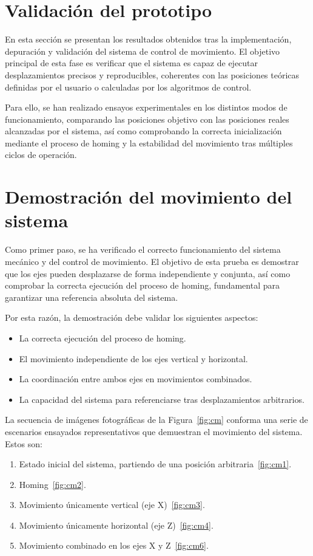 \section{Validación del prototipo}

En esta sección se presentan los resultados obtenidos tras la implementación, depuración y validación del sistema de control de movimiento. El objetivo principal de esta fase es verificar que el sistema es capaz de ejecutar desplazamientos precisos y reproducibles, coherentes con las posiciones teóricas definidas por el usuario o calculadas por los algoritmos de control.

Para ello, se han realizado ensayos experimentales en los distintos modos de funcionamiento, comparando las posiciones objetivo con las posiciones reales alcanzadas por el sistema, así como comprobando la correcta inicialización mediante el proceso de homing y la estabilidad del movimiento tras múltiples ciclos de operación.


\section{Demostración del movimiento del sistema}

Como primer paso, se ha verificado el correcto funcionamiento del sistema mecánico y del control de movimiento. El objetivo de esta prueba es demostrar que los ejes pueden desplazarse de forma independiente y conjunta, así como comprobar la correcta ejecución del proceso de homing, fundamental para garantizar una referencia absoluta del sistema. 

Por esta razón, la demostración debe validar los siguientes aspectos: 

\begin{itemize}
	\item La correcta ejecución del proceso de homing.
	\item El movimiento independiente de los ejes vertical y horizontal.
	\item La coordinación entre ambos ejes en movimientos combinados.
	\item La capacidad del sistema para referenciarse tras desplazamientos arbitrarios.
\end{itemize}

La secuencia de imágenes fotográficas de la Figura~\ref{fig:cm} conforma una serie de escenarios ensayados representativos que demuestran el movimiento del sistema. Estos son:

\begin{enumerate}
	\item Estado inicial del sistema, partiendo de una posición arbitraria~\ref{fig:cm1}. 
	\item Homing~\ref{fig:cm2}.
	\item Movimiento únicamente vertical (eje X)~\ref{fig:cm3}.
	\item Movimiento únicamente horizontal (eje Z)~\ref{fig:cm4}.
	\item Movimiento combinado en los ejes X y Z~\ref{fig:cm6}.
\end{enumerate}


